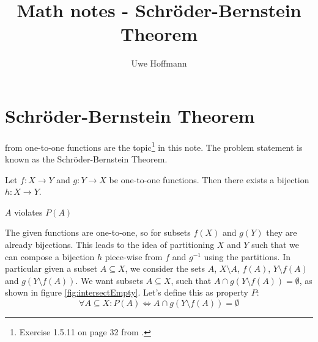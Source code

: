 


\title{Math notes - Schr\"oder-Bernstein Theorem}
\author{Uwe Hoffmann}



\setcounter{chapter}{1}
\section*{Schr\"oder-Bernstein Theorem}

 from one-to-one functions are the topic\footnote{Exercise 1.5.11 on page 32 from .} in this note. The problem statement is known as the Schr\"oder-Bernstein Theorem. 

\vspace{10 mm}
\begin{problem}
Let $f:X \to Y$ and $g:Y \to X$ be one-to-one functions. Then there exists a bijection $h:X \to Y$.	     
\end{problem}

\begin{marginfigure}[1.0in]
\caption{$A$ violates $P(A)$}
\label{fig:intersectNotEmpty}
\end{marginfigure}

The given functions are one-to-one, so for subsets $f(X)$ and $g(Y)$ they are already bijections. This leads to the idea of partitioning $X$ and $Y$ such that we can compose a bijection $h$ piece-wise from $f$ and $g^{-1}$ using the partitions. In particular given a subset $A \subseteq X$, we consider the sets $A$, $X \setminus A$, $f(A)$, $Y \setminus f(A)$ and $g(Y \setminus f(A))$. We want subsets $A \subseteq X$, such that $A \cap g(Y \setminus f(A)) = \emptyset$, as shown in figure \ref{fig:intersectEmpty}. Let's define this as property $P$:
$$
\forall A \subseteq X: P(A) \Leftrightarrow A \cap g(Y \setminus f(A)) = \emptyset
$$

